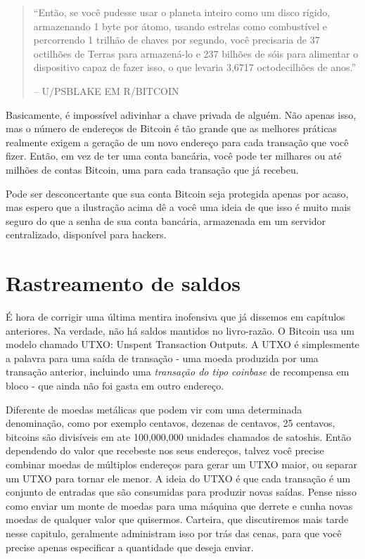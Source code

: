 \begin{quotation}\begin{samepage}
\enquote{Então, se você pudesse usar o planeta inteiro como um disco rígido, armazenando 1 byte por átomo, usando estrelas como combustível e percorrendo 1 trilhão de chaves por segundo, você precisaria de 37 octilhões de Terras para armazená-lo e 237 bilhões de sóis para alimentar o dispositivo capaz de fazer isso, o que levaria 3,6717 octodecilhões de anos.}
\begin{flushright} -- U/PSBLAKE EM R/BITCOIN
\end{flushright}\end{samepage}\end{quotation}

Basicamente, é impossível adivinhar a chave privada de alguém. Não apenas isso, mas o número de endereços de Bitcoin é tão grande que as melhores práticas realmente exigem a geração de um novo endereço para cada transação que você fizer. Então, em vez de ter uma conta bancária, você pode ter milhares ou até milhões de contas Bitcoin, uma para cada transação que já recebeu.

Pode ser desconcertante que sua conta Bitcoin seja protegida apenas por acaso, mas espero que a ilustração acima dê a você uma ideia de que isso é muito mais seguro do que a senha de sua conta bancária, armazenada em um servidor centralizado, disponível para hackers.

\section*{Rastreamento de saldos}

É hora de corrigir uma última mentira inofensiva que já dissemos em capítulos anteriores. Na verdade, não há saldos mantidos no livro-razão. O Bitcoin usa um modelo chamado UTXO: Unspent Transaction Outputs.
A UTXO é simplesmente a palavra para uma saída de transação - uma moeda produzida por uma transação anterior, incluindo uma \textit{transação do tipo coinbase} de recompensa em bloco - que ainda não foi gasta em outro endereço.

Diferente de moedas metálicas que podem vir com uma determinada denominação, como por exemplo centavos, dezenas de centavos, 25 centavos, bitcoins são divisíveis em ate 100,000,000 unidades chamados de satoshis. 
Então dependendo do valor que recebeste nos seus endereços, talvez você precise combinar moedas de múltiplos endereços para gerar um UTXO maior, ou separar um UTXO para tornar ele menor. 
A ideia do UTXO é que cada transação é um conjunto de entradas que são consumidas para produzir novas saídas.
Pense nisso como enviar um monte de moedas para uma máquina que derrete e cunha novas moedas de qualquer valor que quisermos.
Carteira, que discutiremos mais tarde nesse capitulo, geralmente administram isso por trás das cenas, para que você precise apenas especificar a quantidade que deseja enviar.


